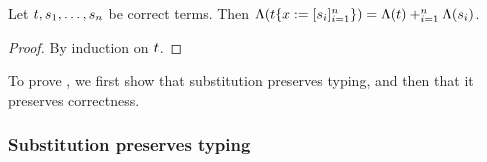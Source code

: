 \begin{lemma}
Let $t,s_1,\hdots,s_n$ be correct terms.
Then
$\Lambda(t\{x := [s_i]_{i=1}^{n}\}) = \Lambda(t) +_{i=1}^n \Lambda(s_i)$.
\end{lemma}
\begin{proof}
By induction on $t$.
\end{proof}

To prove , we first show that substitution preserves typing,
and then that it preserves correctness.

\subsubsection{Substitution preserves typing}

